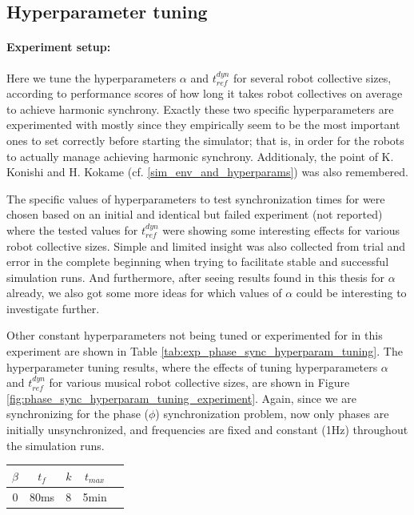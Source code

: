 	
	\subsection{Hyperparameter tuning}
	
		\paragraph{Experiment setup:\nl}
		
		Here we tune the hyperparameters $\alpha$ and $t_{ref}^{dyn}$ for several robot collective sizes, according to performance scores of how long it takes robot collectives on average to achieve harmonic synchrony. Exactly these two specific hyperparameters are experimented with mostly since they empirically seem to be the most important ones to set correctly before starting the simulator; that is, in order for the robots to actually manage achieving harmonic synchrony. Additionaly, the point of K. Konishi and H. Kokame (cf. \ref{sim_env_and_hyperparams}) was also remembered.
		
		The specific values of hyperparameters to test synchronization times for were chosen based on an initial and identical but failed experiment (not reported) where the tested values for $t_{ref}^{dyn}$ were showing some interesting effects for various robot collective sizes. Simple and limited insight was also collected from trial and error in the complete beginning when trying to facilitate stable and successful simulation runs. And furthermore, after seeing results found in this thesis for $\alpha$ already, we also got some more ideas for which values of $\alpha$ could be interesting to investigate further.
		
		Other constant hyperparameters not being tuned or experimented for in this experiment are shown in Table \ref{tab:exp_phase_sync_hyperparam_tuning}. The hyperparameter tuning results, where the effects of tuning hyperparameters $\alpha$ and $t_{ref}^{dyn}$ for various musical robot collective sizes, are shown in Figure \ref{fig:phase_sync_hyperparam_tuning_experiment}. Again, since we are synchronizing for the phase ($\phi$) synchronization problem, now only phases are initially unsynchronized, and frequencies are fixed and constant (1Hz) throughout the simulation runs.
		
		\begin{center}
		\begin{tabular}{ |c|c|c|c|c| } 
		\hline
		$\beta$ & $t_f$ & $k$ & $t_{max}$ \\
		\hline
		0 & 80ms & 8 & 5min \\
		\hline
		\end{tabular}
		\label{tab:exp_phase_sync_hyperparam_tuning}
		\end{center}
		
